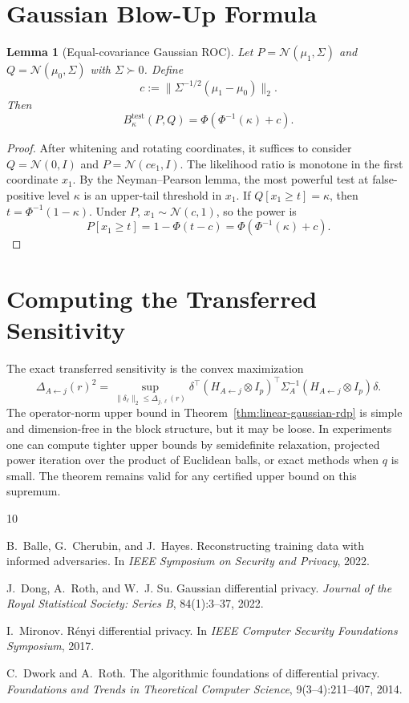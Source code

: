 \documentclass[conference,compsoc]{IEEEtran}
\newtheorem{lemma}{Lemma}
\newcommand{\N}{\mathcal{N}}
\begin{document}
\section{Gaussian Blow-Up Formula}
\label{app:gaussian-blowup}

\begin{lemma}[Equal-covariance Gaussian ROC]
\label{lem:gaussian-roc}
Let $P=\N(\mu_1,\Sigma)$ and $Q=\N(\mu_0,\Sigma)$ with $\Sigma\succ0$. Define
\[
c:=\|\Sigma^{-1/2}(\mu_1-\mu_0)\|_2.
\]
Then
\[
B_\kappa^{\mathrm{test}}(P,Q)=\Phi(\Phi^{-1}(\kappa)+c).
\]
\end{lemma}

\begin{proof}
After whitening and rotating coordinates, it suffices to consider $Q=\N(0,I)$ and $P=\N(ce_1,I)$. The likelihood ratio is monotone in the first coordinate $x_1$. By the Neyman--Pearson lemma, the most powerful test at false-positive level $\kappa$ is an upper-tail threshold in $x_1$. If $Q[x_1\ge t]=\kappa$, then $t=\Phi^{-1}(1-\kappa)$. Under $P$, $x_1\sim\N(c,1)$, so the power is
\[
P[x_1\ge t]
=1-\Phi(t-c)
=\Phi(\Phi^{-1}(\kappa)+c).
\]
\end{proof}

\section{Computing the Transferred Sensitivity}
\label{app:computing-delta}

The exact transferred sensitivity is the convex maximization
\[
\Delta_{A\leftarrow j}(r)^2
=
\sup_{\|\delta_\ell\|_2\le\Delta_{j,\ell}(r)}
\delta^\top
(H_{A\leftarrow j}\otimes I_p)^\top\Sigma_A^{-1}(H_{A\leftarrow j}\otimes I_p)
\delta.
\]
The operator-norm upper bound in Theorem~\ref{thm:linear-gaussian-rdp} is simple and dimension-free in the block structure, but it may be loose. In experiments one can compute tighter upper bounds by semidefinite relaxation, projected power iteration over the product of Euclidean balls, or exact methods when $q$ is small. The theorem remains valid for any certified upper bound on this supremum.

\begin{thebibliography}{10}

B.~Balle, G.~Cherubin, and J.~Hayes.
\newblock Reconstructing training data with informed adversaries.
\newblock In \emph{IEEE Symposium on Security and Privacy}, 2022.

J.~Dong, A.~Roth, and W.~J. Su.
\newblock Gaussian differential privacy.
\newblock \emph{Journal of the Royal Statistical Society: Series B}, 84(1):3--37, 2022.

I.~Mironov.
\newblock R\'enyi differential privacy.
\newblock In \emph{IEEE Computer Security Foundations Symposium}, 2017.

C.~Dwork and A.~Roth.
\newblock The algorithmic foundations of differential privacy.
\newblock \emph{Foundations and Trends in Theoretical Computer Science}, 9(3--4):211--407, 2014.

\end{thebibliography}
\end{document}
